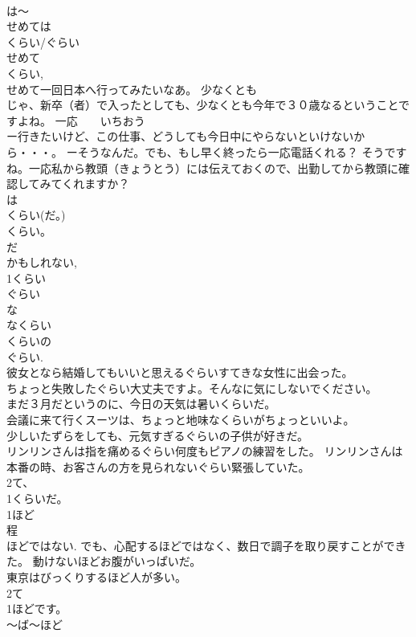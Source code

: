 \documentclass[8pt]{extreport}
\begin{document}
\begin{CJK}{UTF8}{min}
\\	は～ 
\\	せめては
\\	くらい/ぐらい 
\\	せめて 
\\	くらい, 
\\	せめて一回日本へ行ってみたいなあ。 少なくとも 
\\	じゃ、新卒（者）で入ったとしても、少なくとも今年で３０歳なるということですよね。 一応　　いちおう 
\\	ー行きたいけど、この仕事、どうしても今日中にやらないといけないから・・・。 ーそうなんだ。でも、もし早く終ったら一応電話くれる？ そうですね。一応私から教頭（きょうとう）には伝えておくので、出勤してから教頭に確認してみてくれますか？ 
\\	は
\\	くらい(だ。) 
\\	くらい。　
\\	だ 
\\	かもしれない, 
\\	1くらい
\\	ぐらい 
\\	な
\\	なくらい 
\\	くらいの
\\	ぐらい. 
\\	彼女となら結婚してもいいと思えるぐらいすてきな女性に出会った。 
\\	ちょっと失敗したぐらい大丈夫ですよ。そんなに気にしないでください。 
\\	まだ３月だというのに、今日の天気は暑いくらいだ。 
\\	会議に来て行くスーツは、ちょっと地味なくらいがちょっといいよ。 
\\	少しいたずらをしても、元気すぎるぐらいの子供が好きだ。 
\\	リンリンさんは指を痛めるぐらい何度もピアノの練習をした。 リンリンさんは本番の時、お客さんの方を見られないぐらい緊張していた。 
\\	2て、
\\	1くらいだ。 
\\	1ほど
\\	程 
\\	ほどではない. でも、心配するほどではなく、数日で調子を取り戻すことができた。 動けないほどお腹がいっぱいだ。 
\\	東京はびっくりするほど人が多い。 
\\	2て
\\	1ほどです。 
\\	～ば～ほど 

\end{CJK}
\end{document}
